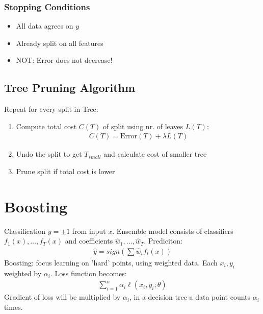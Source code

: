 \documentclass[8pt, a4paper, landscape, includeheadfoot]{extarticle}
\begin{document}
\begin{multicols*}{4}
	\subsubsection{Stopping Conditions}{}
	\begin{itemize}[itemsep=0pt]
		\item All data agrees on $y$
		\item Already split on all features
		\item NOT: Error does not decrease!
	\end{itemize}

	\subsection{Tree Pruning Algorithm}
	Repeat for every split in Tree:
	\begin{enumerate}[itemsep=0pt]
		\item Compute total cost $C(T)$ of split using nr. of leaves $L(T)$:
		      \begin{align*}
			      C(T) = \text{Error}(T) + \lambda L(T)
		      \end{align*}
		\item Undo the split to get $T_{small}$ and calculate cost of smaller tree
		\item Prune split if total cost is lower
	\end{enumerate}
	\section{Boosting}
	Classification $y = \pm 1$ from input $x$. Ensemble model consists of classifiers $f_1(x), \dots, f_T(x)$ and coefficients $\hat{w}_1, \dots, \hat{w}_T$. Prediciton:
	\begin{align}
		\hat{y} = sign\left(\sum \hat{w}_t f_t(x)\right)
	\end{align}
	Boosting: focus learning on 'hard' points, using weighted data. Each $x_i, y_i$ weighted by $\alpha_i$. Loss function becomes:
	\begin{align*}
		\sum_{i=1}^{n}\alpha_i\ell(x_i, y_i; \theta)
	\end{align*}
	Gradient of loss will be multiplied by $\alpha_i$, in a decision tree a data point counts $\alpha_i$ times.

\end{multicols*}
\end{document}
